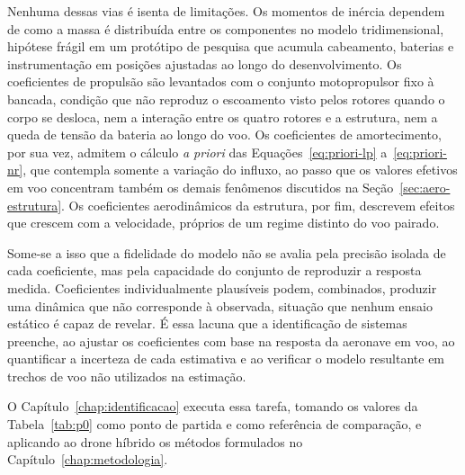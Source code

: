 {Nenhuma dessas vias é isenta de limitações. Os momentos de inércia dependem de como a massa é distribuída entre os componentes no modelo tridimensional, hipótese frágil em um protótipo de pesquisa que acumula cabeamento, baterias e instrumentação em posições ajustadas ao longo do desenvolvimento. Os coeficientes de propulsão são levantados com o conjunto motopropulsor fixo à bancada, condição que não reproduz o escoamento visto pelos rotores quando o corpo se desloca, nem a interação entre os quatro rotores e a estrutura, nem a queda de tensão da bateria ao longo do voo. Os coeficientes de amortecimento, por sua vez, admitem o cálculo \textit{a priori} das Equações~\eqref{eq:priori-lp} a~\eqref{eq:priori-nr}, que contempla somente a variação do influxo, ao passo que os valores efetivos em voo concentram também os demais fenômenos discutidos na Seção~\ref{sec:aero-estrutura}. Os coeficientes aerodinâmicos da estrutura, por fim, descrevem efeitos que crescem com a velocidade, próprios de um regime distinto do voo pairado.

Some-se a isso que a fidelidade do modelo não se avalia pela precisão isolada de cada coeficiente, mas pela capacidade do conjunto de reproduzir a resposta medida. Coeficientes individualmente plausíveis podem, combinados, produzir uma dinâmica que não corresponde à observada, situação que nenhum ensaio estático é capaz de revelar. É essa lacuna que a identificação de sistemas preenche, ao ajustar os coeficientes com base na resposta da aeronave em voo, ao quantificar a incerteza de cada estimativa e ao verificar o modelo resultante em trechos de voo não utilizados na estimação.

O Capítulo~\ref{chap:identificacao} executa essa tarefa, tomando os valores da Tabela~\ref{tab:p0} como ponto de partida e como referência de comparação, e aplicando ao drone híbrido os métodos formulados no Capítulo~\ref{chap:metodologia}.
}
